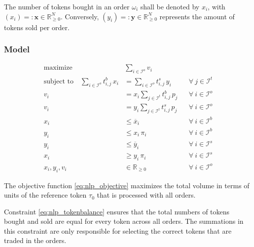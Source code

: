 \documentclass[11pt,parskip=full]{scrartcl}%
\newcommand*{\itokens}{\mathcal{I}^t}       %
\newcommand*{\iorders}{\mathcal{I}^o}       %
\newcommand*{\ibuyorders}{\mathcal{I}^b}    %
\newcommand*{\isellorders}{\mathcal{I}^s}   %
\begin{document}
The number of tokens bought in an order $ \omega_i $ shall be denoted by $ x_i $, with
$ (x_i) =: \mathbf{x} \in \mathbb{R}^N_{\ge 0} $.
Conversely, $ (y_i) =: \mathbf{y} \in \mathbb{R}^N_{\ge 0} $ represents the amount of tokens sold
per order.

\subsubsection*{Model}

\begin{subequations}
\begin{align}
  \text{maximize} \quad & \sum\limits_{i \in \iorders} v_i
  \label{eq:nlp_objective}
  \\[4mm]
  \text{subject to} \quad
  \sum\limits_{i \in \iorders} t^b_{i,j} \, x_i
  &= \sum\limits_{i \in \iorders} t^s_{i,j} \, y_i
  && \forall \> j \in \itokens
  \label{eq:nlp_tokenbalance}
  \\[4mm]
  v_i
  &= x_i \sum\limits_{j \in \itokens} t^b_{i,j} \, p_j
  && \forall \> i \in \iorders
  \label{eq:nlp_buyvolume}
  \\[2mm]
  v_i
  &= y_i \sum\limits_{j \in \itokens} t^s_{i,j} \, p_j
  && \forall \> i \in \iorders
  \label{eq:nlp_sellvolume}
  \\[4mm]
  x_i &\le \overline{x}_i
  && \forall \> i \in \ibuyorders
  \label{eq:nlp_tokenamount_1}
  \\[1mm]
  y_i &\le x_i \, \pi_i
  && \forall \> i \in \ibuyorders
  \label{eq:nlp_tokenamount_2}
  \\[4mm]
  y_i &\le \overline{y}_i
  && \forall \> i \in \isellorders
  \label{eq:nlp_tokenamount_3}
  \\[1mm]
  x_i &\ge y_i \, \pi_i
  && \forall \> i \in \isellorders
  \label{eq:nlp_tokenamount_4}
  \\[4mm]
  x_i, y_i, v_i &\in \mathbb{R}_{\ge 0}
  && \forall \> i \in \iorders
\end{align}
\label{eq:nlp}
\end{subequations}

The objective function \eqref{eq:nlp_objective} maximizes the total volume in terms of units of
the reference token $ \tau_0 $ that is processed with all orders.

Constraint \eqref{eq:nlp_tokenbalance} ensures that the total numbers of tokens bought and sold are
equal for every token across all orders.
The summations in this constraint are only responsible for selecting the correct tokens that are
traded in the orders.
\end{document}
